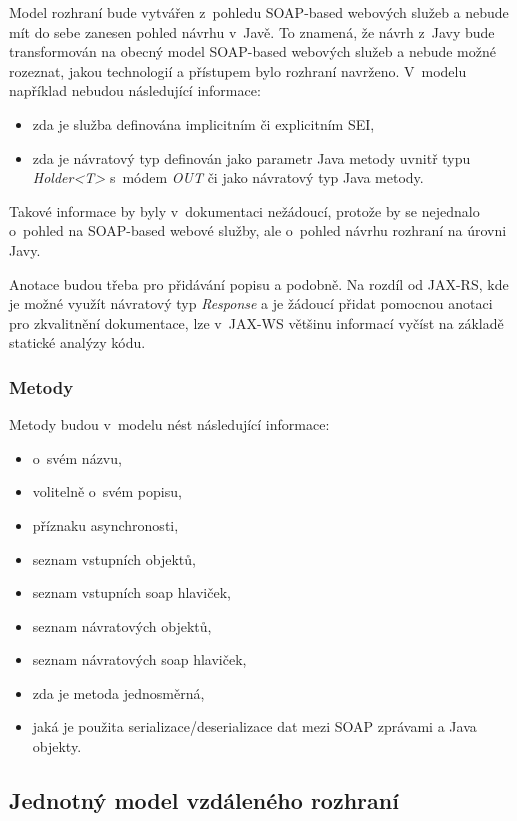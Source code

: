 \documentclass[11pt,twoside,a4paper]{book}
\begin{document}
Model rozhraní bude vytvářen z~pohledu SOAP-based
webových služeb a nebude mít do sebe zanesen pohled návrhu v~Javě. To
znamená, že návrh z~Javy bude transformován na obecný model SOAP-based webových
služeb a nebude možné rozeznat, jakou technologií a přístupem bylo rozhraní
navrženo. V~modelu například nebudou následující informace:

\begin{itemize}
  \item zda je služba definována implicitním či explicitním SEI,
  \item zda je návratový typ definován jako parametr Java metody uvnitř typu
  {\em Holder<T>} s~módem {\em OUT} či jako návratový typ Java metody.
\end{itemize}

Takové informace by byly v~dokumentaci nežádoucí, protože by se nejednalo
o~pohled na SOAP-based webové služby, ale o~pohled návrhu rozhraní na úrovni Javy.

Anotace budou třeba pro přidávání popisu a podobně. Na rozdíl od JAX-RS, kde je
možné využít návratový typ {\em Response} a je žádoucí přidat pomocnou anotaci
pro zkvalitnění dokumentace, lze v~JAX-WS většinu informací vyčíst na základě
statické analýzy kódu.

\subsubsection{Metody}

Metody budou v~modelu nést následující informace:

\begin{itemize}
  \item o~svém názvu,
  \item volitelně o~svém popisu,
  \item příznaku asynchronosti,
  \item seznam vstupních objektů,
  \item seznam vstupních soap hlaviček,
  \item seznam návratových objektů,
  \item seznam návratových soap hlaviček,
  \item zda je metoda jednosměrná,
  \item jaká je použita serializace/deserializace dat mezi SOAP zprávami a Java objekty.
\end{itemize}

\subsection{Jednotný model vzdáleného rozhraní}
\label{subsec:jednotny-model-vzdaleneho-rozhrani}
\end{document}
